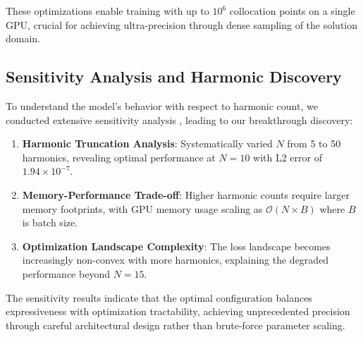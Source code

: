 These optimizations enable training with up to $10^6$ collocation points on a single GPU, crucial for achieving ultra-precision through dense sampling of the solution domain.

\subsection{Sensitivity Analysis and Harmonic Discovery}

To understand the model's behavior with respect to harmonic count, we conducted extensive sensitivity analysis \cite{psaros2023uncertainty}, leading to our breakthrough discovery:

\begin{enumerate}
    \item \textbf{Harmonic Truncation Analysis}: Systematically varied $N$ from 5 to 50 harmonics, revealing optimal performance at $N=10$ with L2 error of $1.94 \times 10^{-7}$.
    
    \item \textbf{Memory-Performance Trade-off}: Higher harmonic counts require larger memory footprints, with GPU memory usage scaling as $\mathcal{O}(N \times B)$ where $B$ is batch size.
    
    \item \textbf{Optimization Landscape Complexity}: The loss landscape becomes increasingly non-convex with more harmonics, explaining the degraded performance beyond $N=15$.
\end{enumerate}

The sensitivity results indicate that the optimal configuration balances expressiveness with optimization tractability, achieving unprecedented precision through careful architectural design rather than brute-force parameter scaling.

